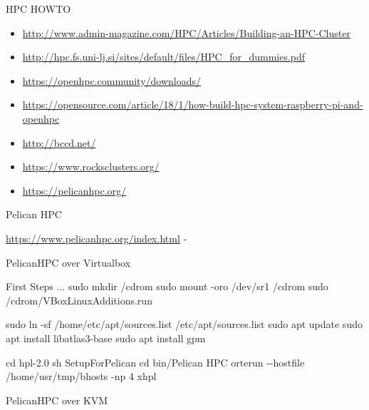 \documentclass[ignorenonframetext,]{beamer}
\begin{document}
\begin{frame}{HPC HOWTO}

\begin{itemize}
\item
  \url{http://www.admin-magazine.com/HPC/Articles/Building-an-HPC-Cluster}
\item
  \url{http://hpc.fs.uni-lj.si/sites/default/files/HPC_for_dummies.pdf}
\item
  \url{https://openhpc.community/downloads/}
\item
  \url{https://opensource.com/article/18/1/how-build-hpc-system-raspberry-pi-and-openhpc}
\item
  \url{http://bccd.net/}
\item
  \url{https://www.rocksclusters.org/}
\item
  \url{https://pelicanhpc.org/}
\end{itemize}

\end{frame}

\begin{frame}{Pelican HPC}

\url{https://www.pelicanhpc.org/index.html} -

\end{frame}

\begin{frame}{PelicanHPC over Virtualbox}

First Steps ... sudo mkdir /cdrom sudo mount -oro /dev/sr1 /cdrom sudo
/cdrom/VBoxLinuxAdditions.run

sudo ln -sf /home/etc/apt/sources.list /etc/apt/sources.list sudo apt
update sudo apt install libatlas3-base sudo apt install gpm

cd hpl-2.0 sh SetupForPelican cd bin/Pelican HPC orterun -\/-hostfile
/home/usr/tmp/bhosts -np 4 xhpl

\end{frame}

\begin{frame}{PelicanHPC over KVM}

\end{frame}
\end{document}
